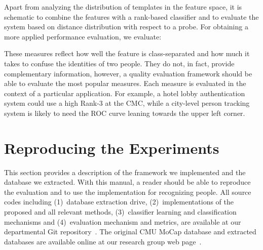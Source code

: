 \documentclass[10pt,a4paper]{llncs}
\newcommand{\gC}{\ensuremath{C}} %
\newcommand{\gE}[1]{\ensuremath{{#1}_E}} %
\begin{document}
Apart from analyzing the distribution of templates in the feature space, it is schematic to combine the features with a rank-based classifier and to evaluate the system based on distance distribution with respect to a probe. For obtaining a more applied performance evaluation, we evaluate:

These measures reflect how well the feature is class-separated and how much it takes to confuse the identities of two people. They do not, in fact, provide complementary information, however, a quality evaluation framework should be able to evaluate the most popular measures. Each measure is evaluated in the context of a particular application. For example, a hotel lobby authentication system could use a high Rank-3 at the CMC, while a city-level person tracking system is likely to need the ROC curve leaning towards the upper left corner.

\section{Reproducing the Experiments}
\label{repro}

This section provides a description of the framework we implemented and the database we extracted. With this manual, a reader should be able to reproduce the evaluation and to use the implementation for recognizing people. All source codes including (1)~database extraction drive, (2)~implementations of the proposed and all relevant methods, (3)~classifier learning and classification mechanisms and (4)~evaluation mechanism and metrics, are available at our departmental Git repository~\cite{WWW1}. The original CMU MoCap database and extracted databases are available online at our research group web page~\cite{WWW2}.
\end{document}
